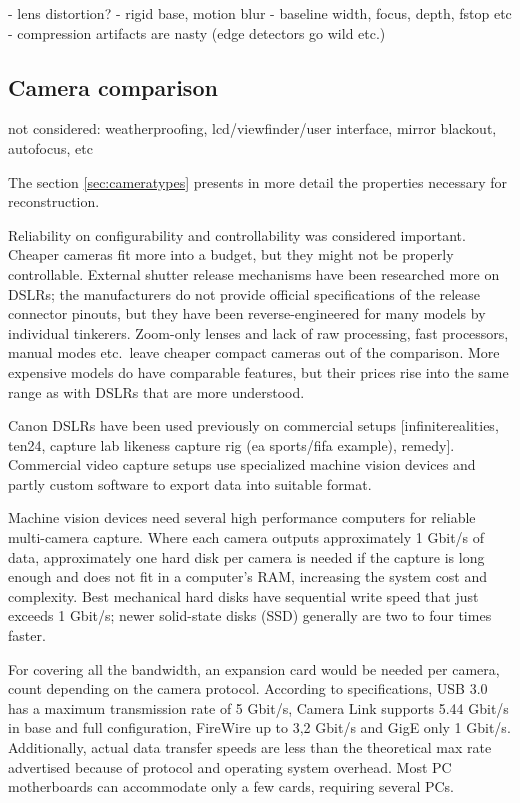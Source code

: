- lens distortion?
- rigid base, motion blur
- baseline width, focus, depth, fstop etc
- compression artifacts are nasty (edge detectors go wild etc.)


\subsection{Camera comparison} %

not considered: weatherproofing, lcd/viewfinder/user interface, mirror blackout, autofocus, etc

The section \ref{sec:cameratypes} presents in more detail the properties necessary for reconstruction.

Reliability on configurability and controllability was considered important.
Cheaper cameras fit more into a budget, but they might not be properly controllable.
External shutter release mechanisms have been researched more on DSLRs;
the manufacturers do not provide official specifications of the release connector pinouts, but they have been reverse-engineered for many models by individual tinkerers.
Zoom-only lenses and lack of raw processing, fast processors, manual modes etc.~leave cheaper compact cameras out of the comparison.
More expensive models do have comparable features, but their prices rise into the same range as with DSLRs that are more understood.

Canon DSLRs have been used previously on commercial setups [infiniterealities, ten24, capture lab likeness capture rig (ea sports/fifa example), remedy].
Commercial video capture setups use specialized machine vision devices and partly custom software to export data into suitable format.

Machine vision devices need several high performance computers for reliable multi-camera capture.
Where each camera outputs approximately 1 Gbit/s of data, approximately one hard disk per camera is needed if the capture is long enough and does not fit in a computer's RAM, increasing the system cost and complexity.
Best mechanical hard disks have sequential write speed that just exceeds 1 Gbit/s;
newer solid-state disks (SSD) generally are two to four times faster.

For covering all the bandwidth, an expansion card would be needed per camera, count depending on the camera protocol. According to specifications, USB 3.0 has a maximum transmission rate of 5 Gbit/s, Camera Link supports 5.44 Gbit/s in base and full configuration, FireWire up to 3,2 Gbit/s and GigE only 1 Gbit/s.
Additionally, actual data transfer speeds are less than the theoretical max rate advertised because of protocol and operating system overhead.
Most PC motherboards can accommodate only a few cards, requiring several PCs.

